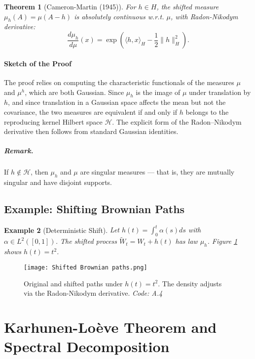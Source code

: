 \documentclass[12pt]{report}
\newtheorem{theorem}{Theorem}[section]
\newtheorem{example}[theorem]{Example}
\begin{document}
\begin{theorem}[Cameron-Martin (1945)]\cite{cameron}
For \(h \in H\), the shifted measure \(\mu_h(A) = \mu(A - h)\) is absolutely continuous w.r.t. \(\mu\), with Radon-Nikodym derivative:
\[
\frac{d\mu_h}{d\mu}(x) = \exp\left(\langle h, x \rangle_H - \frac{1}{2}\|h\|_H^2\right).
\]
\end{theorem}
\subsubsection{Sketch of the Proof}

The proof relies on computing the characteristic functionals of the measures \( \mu \) and \( \mu^h \), which are both Gaussian. Since \( \mu_h \) is the image of \( \mu \) under translation by \( h \), and since translation in a Gaussian space affects the mean but not the covariance, the two measures are equivalent if and only if \( h \) belongs to the reproducing kernel Hilbert space \( \mathcal{H} \). The explicit form of the Radon–Nikodym derivative then follows from standard Gaussian identities.

\paragraph{Remark.} If \( h \notin \mathcal{H} \), then \( \mu_h \) and \( \mu \) are singular measures — that is, they are mutually singular and have disjoint supports.


\section{Example: Shifting Brownian Paths}
\begin{example}[Deterministic Shift]
Let \(h(t) = \int_0^t \alpha(s) ds\) with \(\alpha \in L^2([0,1])\). The shifted process \(\tilde{W}_t = W_t + h(t)\) has law \(\mu_h\). Figure \ref{fig:shift} shows \(h(t) = t^2\).
\end{example}

\begin{figure}[H]
    \centering
    \texttt{[image: Shifted Brownian paths.png]}
    \caption{Original and shifted paths under \(h(t) = t^2\). The density adjusts via the Radon-Nikodym derivative. \textit{Code: A.4}}
    \label{fig:shift}
\end{figure}

\chapter{Karhunen-Loève Theorem and Spectral Decomposition}
\end{document}
